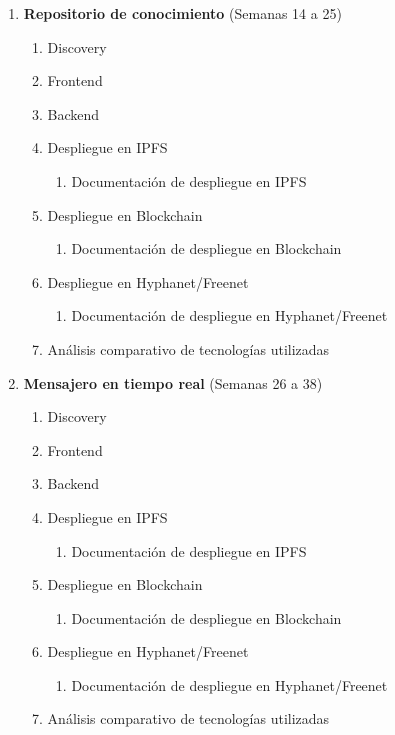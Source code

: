 \begin{enumerate}
    \item \textbf{Repositorio de conocimiento} (Semanas 14 a 25)
    \begin{enumerate}[label*=\arabic*.]
        \item Discovery
        \item Frontend
        \item Backend
        \item Despliegue en IPFS
        \begin{enumerate}[label*=\arabic*.]
            \item Documentación de despliegue en IPFS
        \end{enumerate}
        \item Despliegue en Blockchain
        \begin{enumerate}[label*=\arabic*.]
            \item Documentación de despliegue en Blockchain
        \end{enumerate}
        \item Despliegue en Hyphanet/Freenet
        \begin{enumerate}[label*=\arabic*.]
            \item Documentación de despliegue en Hyphanet/Freenet
        \end{enumerate}
        \item Análisis comparativo de tecnologías utilizadas
    \end{enumerate}
    
    \item \textbf{Mensajero en tiempo real} (Semanas 26 a 38)
    \begin{enumerate}[label*=\arabic*.]
        \item Discovery
        \item Frontend
        \item Backend
        \item Despliegue en IPFS
        \begin{enumerate}[label*=\arabic*.]
            \item Documentación de despliegue en IPFS
        \end{enumerate}
        \item Despliegue en Blockchain
        \begin{enumerate}[label*=\arabic*.]
            \item Documentación de despliegue en Blockchain
        \end{enumerate}
        \item Despliegue en Hyphanet/Freenet
        \begin{enumerate}[label*=\arabic*.]
            \item Documentación de despliegue en Hyphanet/Freenet
        \end{enumerate}
        \item Análisis comparativo de tecnologías utilizadas
    \end{enumerate}

\end{enumerate}

